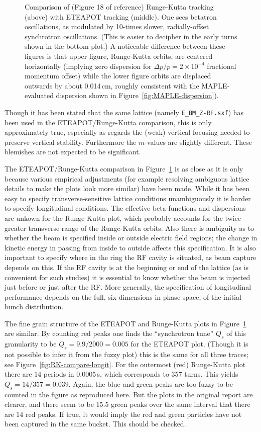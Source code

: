 \documentclass[12]{article}
\begin{document}
\begin{figure}[hbt]
\caption{\label{fig:YKS-ETEAPOT-compare}Comparison of
(Figure 18 of reference\cite{YKS-tracking}) 
Runge-Kutta tracking (above) with ETEAPOT tracking
(middle). One sees betatron oscillations, as modulated by
10-times slower, radially-offset synchrotron oscillations. 
(This is easier to
decipher in the early turns shown in the bottom plot.)
A noticeable difference between these figures is that upper
figure, Runge-Kutta orbits, are centered horizontally 
(implying zero dispersion for $\Delta p/p=2\times10^{-4}$ fractional
momentum offset) while the lower figure orbits are displaced 
outwards by about 0.014\,cm,
roughly consistent with the MAPLE-evaluated dispersion shown in 
Figure~\ref{fig:MAPLE-dispersion}). }
\end{figure}
Though it has been stated that the same lattice (namely {\tt E\_BM\_Z-RF.sxf})
has been used in the ETEAPOT/Runge-Kutta comparison, this is only approximately
true, especially as regards the (weak) vertical focusing needed to preserve
vertical stability. Furthermore the $m$-values are slightly different.
These blemishes are not expected to be significant.

The ETEAPOT/Runge-Kutta comparison in Figure~\ref{fig:YKS-ETEAPOT-compare}
is as close as it is only because various empirical adjustments
(for example resolving ambiguous lattice details to make the plots look
more similar) have been made. While it has been easy to specify 
transverse-sensitive lattice 
conditions unambiguously it is harder to specify longitudinal
conditions. The effective beta-functions and dispersions are unkown
for the Runge-Kutta plot, which probably accounts for the twice greater
transverse range of the Runge-Kutta orbits. Also 
there is ambiguity as to whether the beam is specified 
inside or outside electric field regions; the change in kinetic
energy in passing from inside to outside affects this specification.
It is also important to specify where in the ring the RF cavity is
situated, as beam capture depends on this. If the RF cavity is
at the beginning or end of the lattice (as is convenient for such studies) 
it is essential to know whether the beam is injected just before or
just after the RF. More generally, the specification of longitudinal
performance depends on the full, six-dimensions in phase space,
of the initial bunch distribution.

The fine grain structure of the ETEAPOT and Runge-Kutta plots in
Figure~\ref{fig:YKS-ETEAPOT-compare} are similar. By counting red peaks one
finds the ``synchrotron tune'' $Q_s$ of this granularity to be 
$Q_s=9.9/2000=0.005$ for the ETEAPOT plot. (Though it is not possible to infer 
it from the fuzzy plot) this is the same for all three traces; 
see Figure~\ref{fig:RK-compare-longit}. For the outermost
(red) Runge-Kutta plot there are 14 periods in 0.0005\,s, which corresponds to
357 turns. This yields $Q_s=14/357=0.039$. Again, the blue and green peaks
are too fuzzy to be counted in the figure as reproduced here. But the
plots in the original report\cite{YKS-tracking} are clearer, and there
seem to be 15.5 green peaks over the same interval that there are 14
red peaks. If true, it would imply the red and green particles have not
been captured in the same bucket. This should be checked. 
\end{document}
